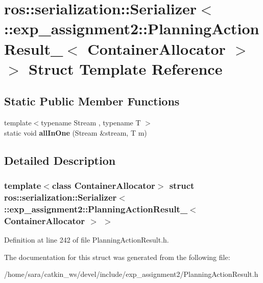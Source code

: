 \hypertarget{structros_1_1serialization_1_1Serializer_3_01_1_1exp__assignment2_1_1PlanningActionResult___3_01ContainerAllocator_01_4_01_4}{}\section{ros\+:\+:serialization\+:\+:Serializer$<$ \+:\+:exp\+\_\+assignment2\+:\+:Planning\+Action\+Result\+\_\+$<$ Container\+Allocator $>$ $>$ Struct Template Reference}
\label{structros_1_1serialization_1_1Serializer_3_01_1_1exp__assignment2_1_1PlanningActionResult___3_01ContainerAllocator_01_4_01_4}
\subsection*{Static Public Member Functions}
\begin{DoxyCompactItemize}
\item 
\mbox{\label{structros_1_1serialization_1_1Serializer_3_01_1_1exp__assignment2_1_1PlanningActionResult___3_01ContainerAllocator_01_4_01_4_a48979893212984bc1ab2046b35f9216c}} 
{\footnotesize template$<$typename Stream , typename T $>$ }\\static void {\bfseries all\+In\+One} (Stream \&stream, T m)
\end{DoxyCompactItemize}


\subsection{Detailed Description}
\subsubsection*{template$<$class Container\+Allocator$>$\newline
struct ros\+::serialization\+::\+Serializer$<$ \+::exp\+\_\+assignment2\+::\+Planning\+Action\+Result\+\_\+$<$ Container\+Allocator $>$ $>$}



Definition at line 242 of file Planning\+Action\+Result.\+h.



The documentation for this struct was generated from the following file\+:\begin{DoxyCompactItemize}
\item 
/home/sara/catkin\+\_\+ws/devel/include/exp\+\_\+assignment2/Planning\+Action\+Result.\+h\end{DoxyCompactItemize}
